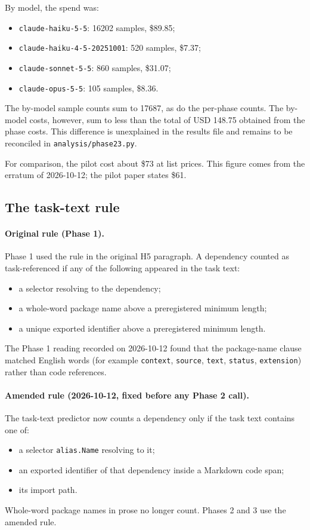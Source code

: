 By model, the spend was:
\begin{itemize}
\item \texttt{claude-haiku-5-5}: 16202 samples, \$89.85;
\item \texttt{claude-haiku-4-5-20251001}: 520 samples, \$7.37;
\item \texttt{claude-sonnet-5-5}: 860 samples, \$31.07;
\item \texttt{claude-opus-5-5}: 105 samples, \$8.36.
\end{itemize}

The by-model sample counts sum to 17687, as do the per-phase counts. The by-model costs, however, sum to less than the total of USD 148.75 obtained from the phase costs. This difference is unexplained in the results file and remains to be reconciled in \texttt{analysis/phase23.py}.

For comparison, the pilot cost about \$73 at list prices. This figure comes from the erratum of 2026-10-12; the pilot paper states \$61.

\subsection{The task-text rule}\label{sec:taskrule}

\paragraph{Original rule (Phase 1).} Phase 1 used the rule in the original H5 paragraph. A dependency counted as task-referenced if any of the following appeared in the task text:
\begin{itemize}
\item a selector resolving to the dependency;
\item a whole-word package name above a preregistered minimum length;
\item a unique exported identifier above a preregistered minimum length.
\end{itemize}

The Phase 1 reading recorded on 2026-10-12 found that the package-name clause matched English words (for example \texttt{context}, \texttt{source}, \texttt{text}, \texttt{status}, \texttt{extension}) rather than code references.

\paragraph{Amended rule (2026-10-12, fixed before any Phase 2 call).} The task-text predictor now counts a dependency only if the task text contains one of:
\begin{itemize}
\item a selector \texttt{alias.Name} resolving to it;
\item an exported identifier of that dependency inside a Markdown code span;
\item its import path.
\end{itemize}
Whole-word package names in prose no longer count. Phases 2 and 3 use the amended rule.

